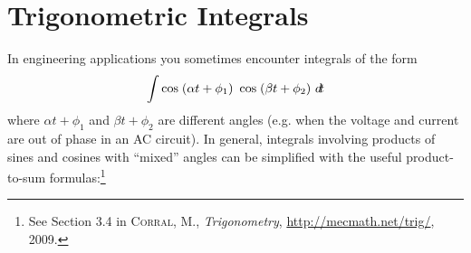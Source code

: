 \section{Trigonometric Integrals}
In engineering applications you sometimes encounter integrals of the form
\[
\int \cos\;(\alpha t + \phi_1)~\cos\;(\beta t + \phi_2)~d\!t
\]
where $\alpha t + \phi_1$ and $\beta t + \phi_2$ are different angles (e.g. when
the voltage and current are out of phase in an AC circuit). In general,
integrals involving products of sines and cosines with ``mixed'' angles can be
simplified with the useful product-to-sum formulas:\footnote{See Section 3.4 in
\textsc{Corral, M.}, \emph{Trigonometry}, \url{http://mecmath.net/trig/}, 2009.}
\begin{center}\end{center}

